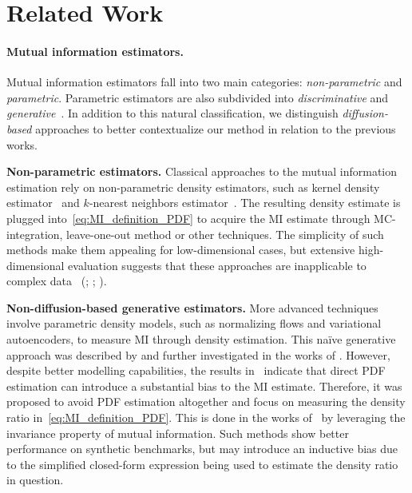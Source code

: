 \section{Related Work}
\paragraph{Mutual information estimators.}
Mutual information estimators fall into two main categories: \emph{non-parametric} and \emph{parametric}.
Parametric estimators are also subdivided into \emph{discriminative} and \emph{generative}~\cite{song2020understanding_limitations,federici2023hybrid_MI_estimation}.
In addition to this natural classification, we distinguish \emph{diffusion-based} approaches to better contextualize our method in relation to the previous works.

\textbf{Non-parametric estimators.}
Classical approaches to the mutual information estimation rely on non-parametric density estimators, such as kernel density estimator~\cite{weglarczyk2018kde_review,goldfeld2019estimating_information_flow} and $ k $-nearest neighbors estimator~\cite{kozachenko1987entropy_of_random_vector,kraskov2004KSG,berrett2019efficient_knn_entropy_estimation}.
The resulting density estimate is plugged into~\eqref{eq:MI_definition_PDF} to acquire the MI estimate through MC-integration, leave-one-out method or other techniques.
The simplicity of such methods make them appealing for low-dimensional cases, but extensive high-dimensional evaluation suggests that these approaches are inapplicable to complex data 
~(\citealt[\wasyparagraph~5.3]{goldfeld2019estimating_information_flow}; \citealt[\wasyparagraph~6.2]{czyz2023beyond_normal}; \citealt[Table 1]{butakov2024normflows}).

\textbf{Non-diffusion-based generative estimators.}
More advanced techniques involve parametric density models, such as normalizing flows and variational autoencoders, to measure MI through density estimation.
This na\"{i}ve generative approach was described by \citep{song2020understanding_limitations,mcallester2020limitations_MI} and further investigated in the works of \citep{Ao_Li_2022entropy_estimation_normflows,duong2023dine}.
However, despite better modelling capabilities, the results in~\citep[Figures 1,2]{song2020understanding_limitations} indicate that direct PDF estimation can introduce a substantial bias to the MI estimate.
Therefore, it was proposed to avoid PDF estimation altogether and focus on measuring the density ratio in~\eqref{eq:MI_definition_PDF}.
This is done in the works of~\citep{duong2023dine,butakov2024normflows}
by leveraging the invariance property of mutual information.
Such methods show better performance on synthetic benchmarks, but may introduce an inductive bias due to the simplified closed-form expression being used to estimate the density ratio in question.

